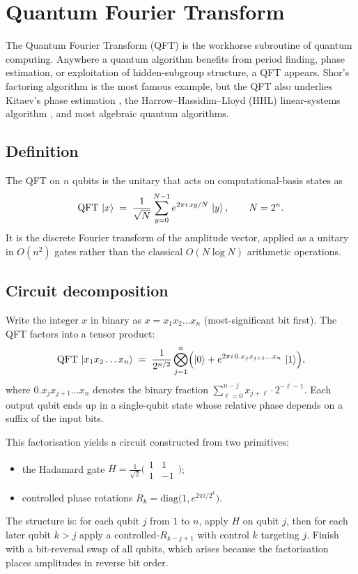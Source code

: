\setcounter{equation}{0}
\section{Quantum Fourier Transform}
\label{sec:qft}

The Quantum Fourier Transform (QFT) is the workhorse subroutine of quantum computing. Anywhere a quantum algorithm benefits from period finding, phase estimation, or exploitation of hidden-subgroup structure, a QFT appears. Shor's factoring algorithm is the most famous example, but the QFT also underlies Kitaev's phase estimation \cite{kitaev1995}, the Harrow--Hassidim--Lloyd (HHL) linear-systems algorithm \cite{hhl2009}, and most algebraic quantum algorithms.

\subsection{Definition}

The QFT on $n$ qubits is the unitary that acts on computational-basis states as
\begin{equation}
\mathrm{QFT}\,\mathinner{|{x}\rangle} \;=\; \frac{1}{\sqrt{N}}\sum_{y=0}^{N-1} e^{2\pi i\, x y / N}\,\mathinner{|{y}\rangle}, \qquad N = 2^n.
\end{equation}
It is the discrete Fourier transform of the amplitude vector, applied as a unitary in $O(n^2)$ gates rather than the classical $O(N\log N)$ arithmetic operations.

\subsection{Circuit decomposition}

Write the integer $x$ in binary as $x = x_1 x_2 \ldots x_n$ (most-significant bit first). The QFT factors into a tensor product:
\begin{equation}
\mathrm{QFT}\,\mathinner{|{x_1 x_2 \ldots x_n}\rangle} \;=\; \frac{1}{2^{n/2}} \bigotimes_{j=1}^{n} \Bigl(\mathinner{|{0}\rangle} + e^{2\pi i\, 0.x_j x_{j+1} \ldots x_n}\,\mathinner{|{1}\rangle}\Bigr),
\end{equation}
where $0.x_j x_{j+1} \ldots x_n$ denotes the binary fraction $\sum_{\ell=0}^{n-j} x_{j+\ell} \cdot 2^{-\ell-1}$. Each output qubit ends up in a single-qubit state whose relative phase depends on a suffix of the input bits.

This factorisation yields a circuit constructed from two primitives:
\begin{itemize}
\item the Hadamard gate $H = \tfrac{1}{\sqrt{2}}\bigl(\begin{smallmatrix} 1 & 1 \\ 1 & -1 \end{smallmatrix}\bigr)$;
\item controlled phase rotations $R_k = \mathrm{diag}\bigl(1, e^{2\pi i / 2^k}\bigr)$.
\end{itemize}
The structure is: for each qubit $j$ from $1$ to $n$, apply $H$ on qubit $j$, then for each later qubit $k>j$ apply a controlled-$R_{k-j+1}$ with control $k$ targeting $j$. Finish with a bit-reversal swap of all qubits, which arises because the factorisation places amplitudes in reverse bit order.

